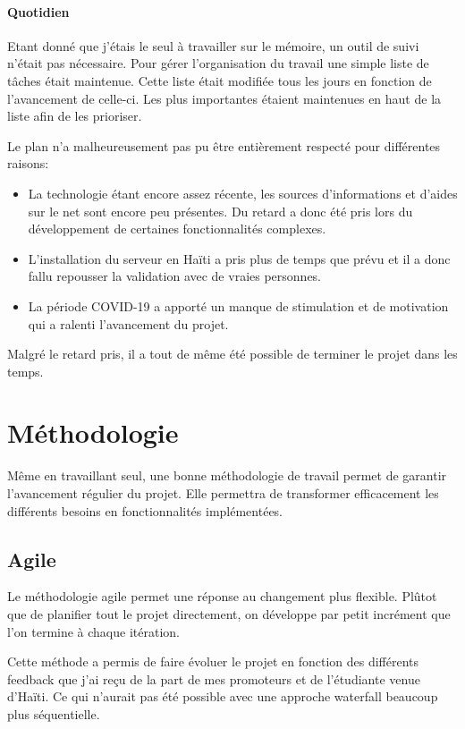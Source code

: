 \documentclass{EPL-master-thesis-covers-FR}
\begin{document}
				\paragraph*{Quotidien}
				Etant donné que j'étais le seul à travailler sur le mémoire, un outil de suivi n'était pas nécessaire. Pour gérer l'organisation du travail une simple liste de tâches était maintenue. Cette liste était modifiée tous les jours en fonction de l'avancement de celle-ci. Les plus importantes étaient maintenues en haut de la liste afin de les prioriser. 
				
				Le plan n'a malheureusement pas pu être entièrement respecté pour différentes raisons:
				\begin{itemize}
					\item La technologie étant encore assez récente, les sources d'informations et d'aides sur le net sont encore peu présentes. Du retard a donc été pris lors du développement de certaines fonctionnalités complexes.
					\item L'installation du serveur en Haïti a pris plus de temps que prévu et il a donc fallu repousser la validation avec de vraies personnes. 
					\item La période COVID-19 a apporté un manque de stimulation et de motivation qui a ralenti l'avancement du projet.
				
				\end{itemize}				
				
				Malgré le retard pris, il a tout de même été possible de terminer le projet dans les temps.
				
				
		\section{Méthodologie}
			Même en travaillant seul, une bonne méthodologie de travail permet de garantir l'avancement régulier du projet. Elle permettra de transformer efficacement les différents besoins en fonctionnalités implémentées.
			

			\subsection*{Agile}
				Le méthodologie agile permet une réponse au changement plus flexible. Plûtot que de planifier tout le projet directement, on développe par petit incrément que l'on termine à chaque itération. 
				
				Cette méthode a permis de faire évoluer le projet en fonction des différents feedback que j'ai reçu de la part de mes promoteurs et de l'étudiante venue d'Haïti. Ce qui n'aurait pas été possible avec une approche waterfall beaucoup plus séquentielle.
				
\end{document}
